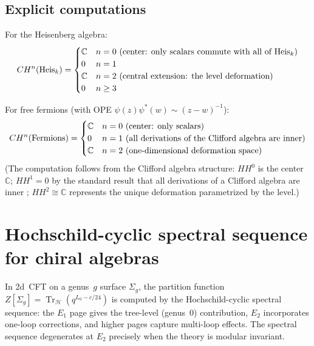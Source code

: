 \subsection{Explicit computations}

For the Heisenberg algebra:
\[CH^n(\text{Heis}_k) = \begin{cases}
\mathbb{C} & n = 0 \text{ (center: only scalars commute with all of } \text{Heis}_k) \\
0 & n = 1 \\
\mathbb{C} & n = 2 \text{ (central extension: the level deformation)} \\
0 & n \geq 3
\end{cases}\]

For free fermions (with OPE $\psi(z)\psi^*(w) \sim (z-w)^{-1}$):
\[CH^n(\text{Fermions}) = \begin{cases}
\mathbb{C} & n = 0 \text{ (center: only scalars)} \\
0 & n = 1 \text{ (all derivations of the Clifford algebra are inner)} \\
\mathbb{C} & n = 2 \text{ (one-dimensional deformation space)}
\end{cases}\]
(The computation follows from the Clifford algebra structure: $HH^0$ is the center $\mathbb{C}$; $HH^1 = 0$ by the standard result that all derivations of a Clifford algebra are inner \cite[Ch.~9]{Weibel94}; $HH^2 \cong \mathbb{C}$ represents the unique deformation parametrized by the level.)
\section{Hochschild-cyclic spectral sequence for chiral algebras}
\label{sec:hochschild-cyclic-spectral}

\begin{remark}
In 2d~CFT on a genus~$g$ surface $\Sigma_g$, the partition function
$Z[\Sigma_g] = \operatorname{Tr}_{\mathcal{H}}(q^{L_0-c/24})$ is computed by the
Hochschild-cyclic spectral sequence: the $E_1$ page gives the tree-level (genus~0)
contribution, $E_2$ incorporates one-loop corrections, and higher pages capture
multi-loop effects.  The spectral sequence degenerates at $E_2$ precisely when the
theory is modular invariant.
\end{remark}

